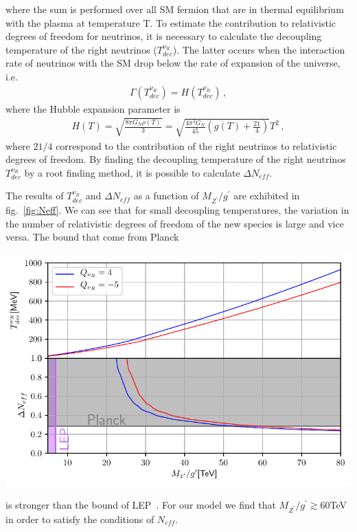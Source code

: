 \documentclass[12pt]{article}
\begin{document}
%
where the sum is performed over all SM fermion that are in thermal equilibrium with the plasma at temperature T. To estimate the contribution to relativistic degrees of freedom for neutrinos, it is necessary to calculate the decoupling temperature of the right neutrinos ($T^{\nu_R}_{dec}$). The latter occurs when the interaction rate of neutrinos with the SM drop below the rate of expansion of the universe, i.e.
%
\begin{align*}
\Gamma(T^{\nu_R}_{dec}) = H(T^{\nu_R}_{dec})\,, 
\end{align*}
%
where the Hubble expansion parameter is
%
\begin{align*}
    H(T) = \sqrt{\frac{8 \pi G_{N} \rho(T)}{3}} = \sqrt{\frac{4 \pi^{3} G_{N}}{45} \left( g(T) + \frac{21}{4} \right)} T^{2}\,,
\end{align*}
%
where $21/4$ correspond to the contribution of the right neutrinos to relativistic degrees of freedom. By finding the decoupling temperature of the right neutrinos $T^{\nu_R}_{dec} $ by a root finding method, it is possible to calculate $\Delta N_{eff}$.

The results of $T^{\nu_R}_{dec}$ and $\Delta N_{eff}$ as a function of $M_{Z^{\prime}}/g^{\prime}$ are exhibited in fig.~\ref{fig:Neff}. We can see that for small decoupling temperatures, the variation in the number of relativistic degrees of freedom of the new species is large and vice versa. The bound that come from Planck~\cite{ghanim:2018eyx}

\includegraphics[scale=0.9]{DeltaNeff.pdf}

is stronger than the bound of LEP~\cite{Alioli:2017nzr}. For our model we find that $M_{Z^{\prime}}/g^{\prime} \gtrsim 60$TeV in order to satisfy the conditions of $N_{eff}$.
\end{document}
